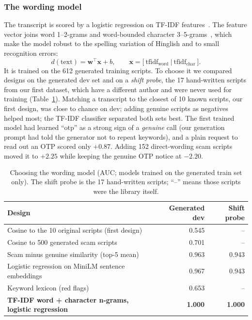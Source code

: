 \documentclass[letterpaper,12pt]{article}
\begin{document}
\subsubsection{The wording model}\label{sec:model}
The transcript is scored by a logistic regression on TF-IDF features~\cite{salton1988term}. The feature vector joins word 1--2-grams and word-bounded character 3--5-grams~\cite{cavnar1994ngram}, which make the model robust to the spelling variation of Hinglish and to small recognition errors:
\begin{equation}
d(\text{text}) = \mathbf{w}^{\top}\mathbf{x} + b, \qquad \mathbf{x} = \bigl[\ \mathrm{tfidf}_{\text{word}}\ \big|\ \mathrm{tfidf}_{\text{char}}\ \bigr].
\end{equation}
It is trained on the 612 generated training scripts. To choose it we compared designs on the generated dev set and on a \emph{shift probe}, the 17 hand-written scripts from our first dataset, which have a different author and were never used for training (Table~\ref{tab:select}). Matching a transcript to the closest of 10 known scripts, our first design, was close to chance on dev; adding genuine scripts as negatives helped most; the TF-IDF classifier separated both sets best. The first trained model had learned ``otp'' as a strong sign of a \emph{genuine} call (our generation prompt had told the generator not to repeat keywords), and a plain request to read out an OTP scored only $+0.87$. Adding 152 direct-wording scam scripts moved it to $+2.25$ while keeping the genuine OTP notice at $-2.20$.

\begin{table}[H]
\centering
\caption{Choosing the wording model (AUC; models trained on the generated train set only). The shift probe is the 17 hand-written scripts; ``--'' means those scripts were the library itself.}
\label{tab:select}
\begin{tabular}{@{}lrr@{}}
\toprule
Design & Generated dev & Shift probe \\ \midrule
Cosine to the 10 original scripts (first design) & 0.545 & -- \\
Cosine to 500 generated scam scripts & 0.701 & -- \\
Scam minus genuine similarity (top-5 mean) & 0.963 & 0.943 \\
Logistic regression on MiniLM sentence embeddings & 0.967 & 0.943 \\
Keyword lexicon (red flags) & 0.653 & -- \\
\textbf{TF-IDF word + character n-grams, logistic regression} & \textbf{1.000} & \textbf{1.000} \\
\bottomrule
\end{tabular}
\end{table}
\end{document}

